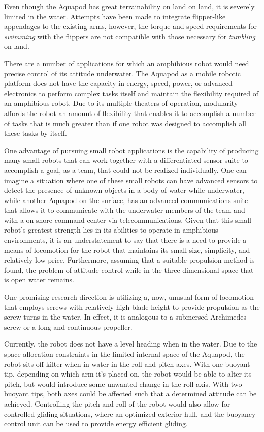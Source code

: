 Even though the Aquapod has great terrainability on
land \cite{Hemes2012} on land, it is severely limited in the water. Attempts
have been made to integrate flipper-like appendages to the existing arms,
however, the torque and speed requirements for \emph{swimming} with the flippers
are not compatible with those necessary for \emph{tumbling} on land.


There are a number of applications for which an amphibious robot would need
precise control of its attitude underwater. The Aquapod as a mobile robotic
platform does not have the capacity in energy, speed, power, or advanced
electronics to perform complex tasks itself and maintain the flexibility
required of an amphibious robot. Due to its multiple theaters of operation,
modularity affords the robot an amount of flexibility that enables it to
accomplish a number of tasks that is much greater than if one robot was designed
to accomplish all these tasks by itself.

One advantage of pursuing small robot applications is the capability of
producing many small robots that can work together with a differentiated sensor
suite to accomplish a goal, as a team, that could not be realized individually.
One can imagine a situation where one of these small robots can have advanced
sensors to detect the presence of unknown objects in a body of water while
underwater, while another Aquapod on the surface, has an advanced communications
suite that allows it to communicate with the underwater members of the team and
with a on-shore command center via telecommunications.  Given that this small
robot's greatest strength lies in its abilities to operate in amphibious
environments, it is an understatement to say that there is a need to provide a
means of locomotion for the robot that maintains its small size, simplicity, and
relatively low price. Furthermore, assuming that a suitable propulsion method is
found, the problem of attitude control while in the three-dimensional space that
is open water remains.

One promising research direction is utilizing a, now, unusual form of locomotion
that employs screws with relatively high blade height to provide propulsion as
the screw turns in the water. In effect, it is analogous to a submersed
Archimedes screw \cite{Freeberg2010} or a long and continuous
propeller\cite{Cole1961c}.


Currently, the robot does not have a level heading when in the water. Due to the
space-allocation constraints in the limited internal space of the Aquapod, the
robot sits off kilter when in water in the roll and pitch axes. With one buoyant
tip, depending on which arm it’s placed on, the robot would be able to alter its
pitch, but would introduce some unwanted change in the roll axis. With two
buoyant tips, both axes could be affected such that a determined attitude can be
achieved. Controlling the pitch and roll of the robot would also allow for
controlled gliding situations, where an optimized exterior hull, and the
buoyancy control unit can be used to provide energy efficient gliding.

